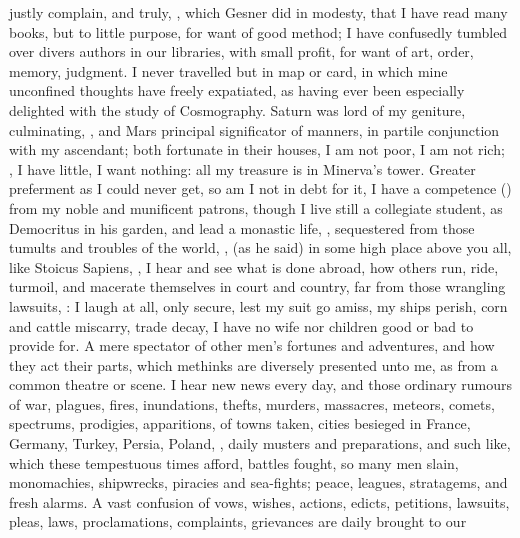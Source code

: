 justly complain, and truly, , which Gesner did in modesty, that
I have read many books, but to little purpose, for want of good method; I have
confusedly tumbled over divers authors in our libraries, with small profit, for
want of art, order, memory, judgment. I never travelled but in map or card, in
which mine unconfined thoughts have freely expatiated, as having ever been
especially delighted with the study of Cosmography. Saturn
was lord of my geniture, culminating, \etc{}, and Mars principal significator
of manners, in partile conjunction with my ascendant; both fortunate in their
houses, \etc{} I am not poor, I am not rich; , I
have little, I want nothing: all my treasure is in Minerva's tower. Greater
preferment as I could never get, so am I not in debt for it, I have a
competence () from my noble and munificent patrons,
though I live still a collegiate student, as Democritus in his garden, and lead
a monastic life, ,
sequestered from those tumults and troubles of the world, , (as he said) in some high place above you
all, like Stoicus Sapiens, , I hear and see what is done abroad, how others
run, ride, turmoil, and macerate themselves in court and
country, far from those wrangling lawsuits, : I laugh at all, only
secure, lest my suit go amiss, my ships perish, corn and cattle miscarry, trade
decay, I have no wife nor children good or bad to provide for. A mere spectator
of other men's fortunes and adventures, and how they act their parts, which
methinks are diversely presented unto me, as from a common theatre or scene. I
hear new news every day, and those ordinary rumours of war, plagues, fires,
inundations, thefts, murders, massacres, meteors, comets, spectrums, prodigies,
apparitions, of towns taken, cities besieged in France, Germany, Turkey,
Persia, Poland, \etc{}, daily musters and preparations, and such like, which
these tempestuous times afford, battles fought, so many men slain, monomachies,
shipwrecks, piracies and sea-fights; peace, leagues, stratagems, and fresh
alarms. A vast confusion of vows, wishes, actions, edicts, petitions, lawsuits,
pleas, laws, proclamations, complaints, grievances are daily brought to our

